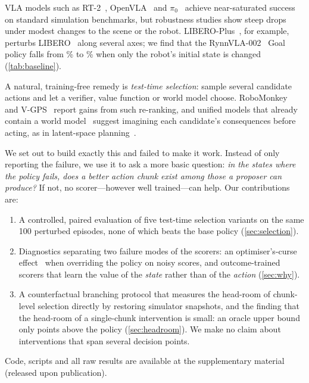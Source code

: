\documentclass[11pt]{article}
\newcommand{\coderef}{the supplementary material (released upon publication)}
\newcommand{\coderef}{\url{https://github.com/wangyk10086/LIS-VLA}}
\begin{document}
VLA models such as RT-2~\citep{brohan2023rt2}, OpenVLA~\citep{kim2024openvla} and $\pi_0$~\citep{black2024pi0} achieve near-saturated success on standard simulation benchmarks, but robustness studies show steep drops under modest changes to the scene or the robot. LIBERO-Plus~\citep{fei2025liberoplus}, for example, perturbs LIBERO~\citep{liu2023libero} along several axes; we find that the RynnVLA-002~\citep{cen2025rynnvla002} Goal policy falls from \goalVanilla\% to \goalPlusRobot\% when only the robot's initial state is changed (\cref{tab:baseline}).

A natural, training-free remedy is \emph{test-time selection}: sample several candidate actions and let a verifier, value function or world model choose. RoboMonkey~\citep{kwok2025robomonkey} and V-GPS~\citep{nakamoto2024vgps} report gains from such re-ranking, and unified models that already contain a world model~\citep{cen2025worldvla,cen2025rynnvla002} suggest imagining each candidate's consequences before acting, as in latent-space planning~\citep{hafner2018planet,hansen2023tdmpc2,zhou2024dinowm}.

We set out to build exactly this and failed to make it work. Instead of only reporting the failure, we use it to ask a more basic question: \emph{in the states where the policy fails, does a better action chunk exist among those a proposer can produce?} If not, no scorer---however well trained---can help. Our contributions are:
\begin{enumerate}[leftmargin=*,itemsep=2pt]
  \item A controlled, paired evaluation of five test-time selection variants on the same 100 perturbed episodes, none of which beats the base policy (\cref{sec:selection}).
  \item Diagnostics separating two failure modes of the scorers: an optimiser's-curse effect~\citep{smith2006optimizer} when overriding the policy on noisy scores, and outcome-trained scorers that learn the value of the \emph{state} rather than of the \emph{action} (\cref{sec:why}).
  \item A counterfactual branching protocol that measures the head-room of chunk-level selection directly by restoring simulator snapshots, and the finding that the head-room of a single-chunk intervention is small: an oracle upper bound only \oracleGain{} points above the policy (\cref{sec:headroom}). We make no claim about interventions that span several decision points.
\end{enumerate}
Code, scripts and all raw results are available at \coderef.
\end{document}
